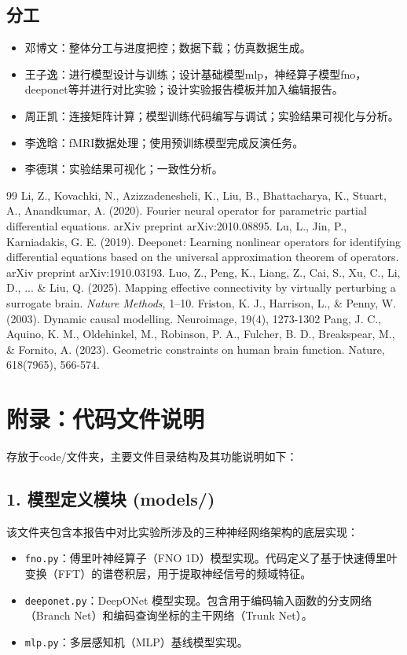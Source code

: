 \documentclass[12pt,a4paper]{article}
\begin{document}
\subsection{分工}
\begin{itemize}
    \item 邓博文：整体分工与进度把控；数据下载；仿真数据生成。
    \item 王子逸：进行模型设计与训练；设计基础模型mlp，神经算子模型fno，deeponet等并进行对比实验；设计实验报告模板并加入编辑报告。
    \item 周正凯：连接矩阵计算；模型训练代码编写与调试；实验结果可视化与分析。
    \item 李逸晗：fMRI数据处理；使用预训练模型完成反演任务。
    \item 李德琪：实验结果可视化；一致性分析。
\end{itemize}



\begin{thebibliography}{99}
 Li, Z., Kovachki, N., Azizzadenesheli, K., Liu, B., Bhattacharya, K., Stuart, A., Anandkumar, A. (2020). Fourier neural operator for parametric partial differential equations. arXiv preprint arXiv:2010.08895.
 Lu, L., Jin, P., Karniadakis, G. E. (2019). Deeponet: Learning nonlinear operators for identifying differential equations based on the universal approximation theorem of operators. arXiv preprint arXiv:1910.03193.
 Luo, Z., Peng, K., Liang, Z., Cai, S., Xu, C., Li, D., ... \& Liu, Q. (2025). Mapping effective connectivity by virtually perturbing a surrogate brain. \emph{Nature Methods}, 1--10.
 Friston, K. J., Harrison, L., \& Penny, W. (2003). Dynamic causal modelling. Neuroimage, 19(4), 1273-1302
 Pang, J. C., Aquino, K. M., Oldehinkel, M., Robinson, P. A., Fulcher, B. D., Breakspear, M., \& Fornito, A. (2023). Geometric constraints on human brain function. Nature, 618(7965), 566-574.
\end{thebibliography}

\appendix
\section{附录：代码文件说明}

存放于code/文件夹，主要文件目录结构及其功能说明如下：

\subsection*{1. 模型定义模块 (models/)}
该文件夹包含本报告中对比实验所涉及的三种神经网络架构的底层实现：
\begin{itemize}
    \item \texttt{fno.py}：傅里叶神经算子（FNO 1D）模型实现。代码定义了基于快速傅里叶变换（FFT）的谱卷积层，用于提取神经信号的频域特征。
    \item \texttt{deeponet.py}：DeepONet 模型实现。包含用于编码输入函数的分支网络（Branch Net）和编码查询坐标的主干网络（Trunk Net）。
    \item \texttt{mlp.py}：多层感知机（MLP）基线模型实现。
\end{itemize}
\end{document}
